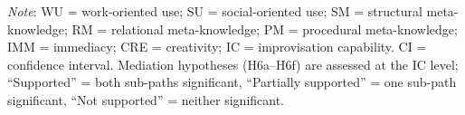 \documentclass[authoryear,preprint,review,times,10pt]{elsarticle}
\begin{document}
\begin{table}[!htbp]
\begin{threeparttable}
\begin{tabular*}{0.9\textwidth}{@{\extracolsep{\fill}}llccc}
\bottomrule
\end{tabular*}
\begin{tablenotes}[flushleft]
\small\linespread{1}\selectfont
\item \textit{Note}: WU = work-oriented use; SU = social-oriented use; SM = structural meta-knowledge; RM = relational meta-knowledge; PM = procedural meta-knowledge; IMM = immediacy; CRE = creativity; IC = improvisation capability. CI = confidence interval. Mediation hypotheses (H6a--H6f) are assessed at the IC level; ``Supported'' = both sub-paths significant, ``Partially supported'' = one sub-path significant, ``Not supported'' = neither significant.
\end{tablenotes}
\end{threeparttable}
\end{table}
\end{document}
